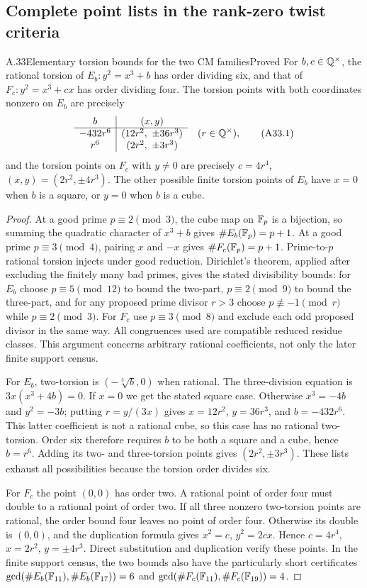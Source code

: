 \subsection{Complete point lists in the rank-zero twist criteria}

\begin{statement}{A.33}{Elementary torsion bounds for the two CM families}{Proved}
For $b,c\in\mathbb Q^\times$, the rational torsion of
$E_b:y^2=x^3+b$ has order dividing six, and that of
$F_c:y^2=x^3+cx$ has order dividing four. The torsion points with both
coordinates nonzero on $E_b$ are precisely
\[
\begin{array}{c|c}
b & (x,y)\\\hline
-432r^6 &(12r^2,\ \pm36r^3)\\
r^6 &(2r^2,\ \pm3r^3)
\end{array}
\quad(r\in\mathbb Q^\times),
\tag{A33.1}
\]
and the torsion points on $F_c$ with $y\ne0$ are precisely
$c=4r^4$, $(x,y)=(2r^2,\pm4r^3)$.
The other possible finite torsion points of $E_b$ have $x=0$ when
$b$ is a square, or $y=0$ when $b$ is a cube.
\end{statement}
\begin{proof}
At a good prime $p\equiv2\pmod3$, the cube map on $\mathbb F_p$ is a
bijection, so summing the quadratic character of $x^3+b$ gives
$\#E_b(\mathbb F_p)=p+1$. At a good prime $p\equiv3\pmod4$, pairing $x$
and $-x$ gives $\#F_c(\mathbb F_p)=p+1$. Prime-to-$p$ rational torsion
injects under good reduction. Dirichlet's theorem, applied after
excluding the finitely many bad primes, gives the stated divisibility
bounds: for $E_b$ choose $p\equiv5\pmod{12}$ to bound the two-part,
$p\equiv2\pmod9$ to bound the three-part, and for any proposed
prime divisor $r>3$ choose $p\not\equiv-1\pmod r$ while
$p\equiv2\pmod3$. For $F_c$ use $p\equiv3\pmod8$ and exclude
each odd proposed divisor in the same way. All congruences used are
compatible reduced residue classes. This argument concerns arbitrary
rational coefficients, not only the later finite support census.

For $E_b$, two-torsion is $(-\sqrt[3]b,0)$ when rational. The
three-division equation is $3x(x^3+4b)=0$. If $x=0$ we get the
stated square case. Otherwise $x^3=-4b$ and $y^2=-3b$; putting
$r=y/(3x)$ gives $x=12r^2$, $y=36r^3$, and $b=-432r^6$.
This latter coefficient is not a rational cube, so this case has
no rational two-torsion. Order six therefore requires $b$ to be
both a square and a cube, hence $b=r^6$. Adding its two- and
three-torsion points gives $(2r^2,\pm3r^3)$. These lists exhaust
all possibilities because the torsion order divides six.

For $F_c$ the point $(0,0)$ has order two. A rational point of order
four must double to a rational point of order two. If all three
nonzero two-torsion points are rational, the order bound four leaves
no point of order four. Otherwise its double is $(0,0)$, and the
duplication formula gives $x^2=c$, $y^2=2cx$. Hence $c=4r^4$,
$x=2r^2$, $y=\pm4r^3$. Direct substitution and duplication verify
these points. In the finite support census, the two bounds also have
the particularly short certificates
$\gcd(\#E_b(\mathbb F_{11}),\#E_b(\mathbb F_{17}))=6$ and
$\gcd(\#F_c(\mathbb F_{11}),\#F_c(\mathbb F_{19}))=4$.
\end{proof}

